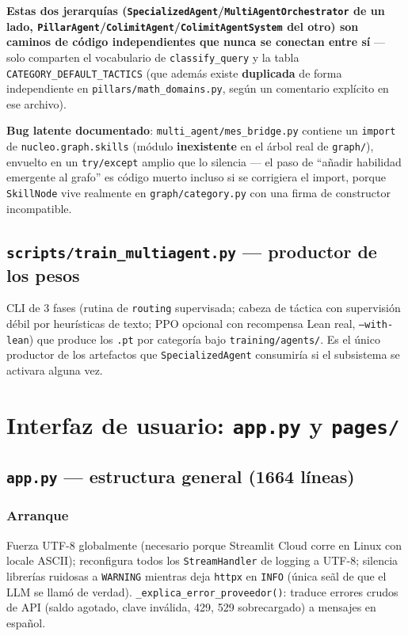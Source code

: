 \documentclass[11pt,a4paper]{report}
\newcommand{\code}[1]{\texttt{#1}}
\begin{document}
\textbf{Estas dos jerarqu\'ias (\code{SpecializedAgent}/\code{MultiAgentOrchestrator} de un lado, \code{PillarAgent}/\code{ColimitAgent}/\code{ColimitAgentSystem} del otro) son caminos de c\'odigo independientes que nunca se conectan entre s\'i} --- solo comparten el vocabulario de \code{classify_query} y la tabla \code{CATEGORY_DEFAULT_TACTICS} (que adem\'as existe \textbf{duplicada} de forma independiente en \code{pillars/math_domains.py}, seg\'un un comentario expl\'icito en ese archivo).

\textbf{Bug latente documentado}: \code{multi_agent/mes_bridge.py} contiene un \code{import} de \code{nucleo.graph.skills} (m\'odulo \textbf{inexistente} en el \'arbol real de \code{graph/}), envuelto en un \code{try/except} amplio que lo silencia --- el paso de ``a\~nadir habilidad emergente al grafo'' es c\'odigo muerto incluso si se corrigiera el import, porque \code{SkillNode} vive realmente en \code{graph/category.py} con una firma de constructor incompatible.

\section{\code{scripts/train_multiagent.py} --- productor de los pesos}

CLI de 3 fases (rutina de \code{routing} supervisada; cabeza de t\'actica con supervisi\'on d\'ebil por heur\'isticas de texto; PPO opcional con recompensa Lean real, \code{--with-lean}) que produce los \code{.pt} por categor\'ia bajo \code{training/agents/}. Es el \'unico productor de los artefactos que \code{SpecializedAgent} consumir\'ia si el subsistema se activara alguna vez.

\chapter{Interfaz de usuario: \code{app.py} y \code{pages/}}

\section{\code{app.py} --- estructura general (1664 l\'ineas)}

\subsection{Arranque}
Fuerza UTF-8 globalmente (necesario porque Streamlit Cloud corre en Linux con locale ASCII); reconfigura todos los \code{StreamHandler} de logging a UTF-8; silencia librer\'ias ruidosas a \code{WARNING} mientras deja \code{httpx} en \code{INFO} (\'unica se\~al de que el LLM se llam\'o de verdad). \code{\_explica_error_proveedor()}: traduce errores crudos de API (saldo agotado, clave inv\'alida, 429, 529 sobrecargado) a mensajes en espa\~nol.
\end{document}
